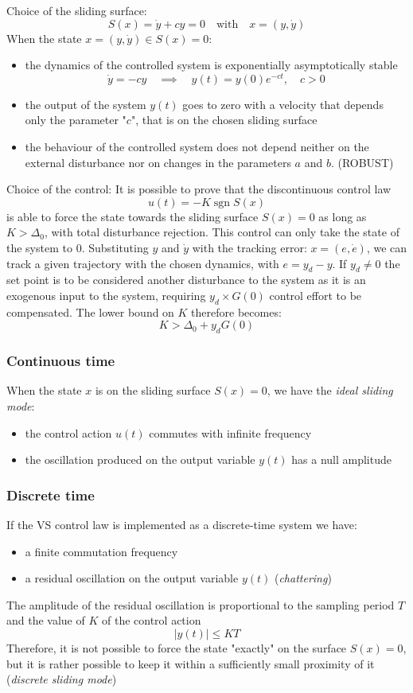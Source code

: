 \documentclass{book}
\DeclareMathOperator{\sgn}{sgn}
\begin{document}
Choice of the sliding surface:
\[
    S(x) = \dot{y} + cy = 0 \quad \text{with} \quad x=(y,\dot{y})
\]
When the state $x=(y,\dot{y})\in S(x)=0$:
\begin{itemize}
    \item the dynamics of the controlled system is exponentially asymptotically stable \[
            \dot{y} = -cy \quad \implies \quad y(t) = y(0)e^{-ct}, \quad c>0
    \]
    \item the output of the system $y(t)$ goes to zero with a velocity that depends only the parameter "$c$", that is on the chosen sliding surface
    \item the behaviour of the controlled system does not depend neither on the external disturbance nor on changes in the parameters $a$ and $b$. (ROBUST)
\end{itemize}

Choice of the control: It is possible to prove that the discontinuous control law
\[
    u(t) = -K \sgn S(x)
\]
is able to force the state towards the sliding surface $S(x)=0$ as long as $K>\Delta_0$, with total disturbance rejection. This control can only take the state of the system to 0. Substituting $y$ and $\dot{y}$ with the tracking error: $x=(e,\dot{e})$, we can track a given trajectory with the chosen dynamics, with $e=y_d-y$. If $y_d\neq 0 $ the set point is to be considered another disturbance to the system as it is an exogenous input to the system, requiring $y_d \times G(0)$ control effort to be compensated. The lower bound on $K$ therefore becomes:
\[
    K>\Delta_0+y_dG(0)
\]

\subsubsection{Continuous time}
When the state $x$ is on the sliding surface $S(x)=0$, we have the \emph{ideal sliding mode}: 
\begin{itemize}
    \item the control action $u(t)$ commutes with infinite frequency
    \item the oscillation produced on the output variable $y(t)$ has a null amplitude
\end{itemize}
\subsubsection{Discrete time}
If the VS control law is implemented as a discrete-time system we have:
\begin{itemize}
    \item a finite commutation frequency
    \item a residual oscillation on the output variable $y(t)$ (\emph{chattering})
\end{itemize}
The amplitude of the residual oscillation is proportional to the sampling period $T$ and the value of $K$ of the control action
\[
    |y(t)|\leq KT
\]
Therefore, it is not possible to force the state "exactly" on the surface $S(x)=0$, but it is rather possible to keep it within a sufficiently small proximity of it (\emph{discrete sliding mode})
\end{document}
